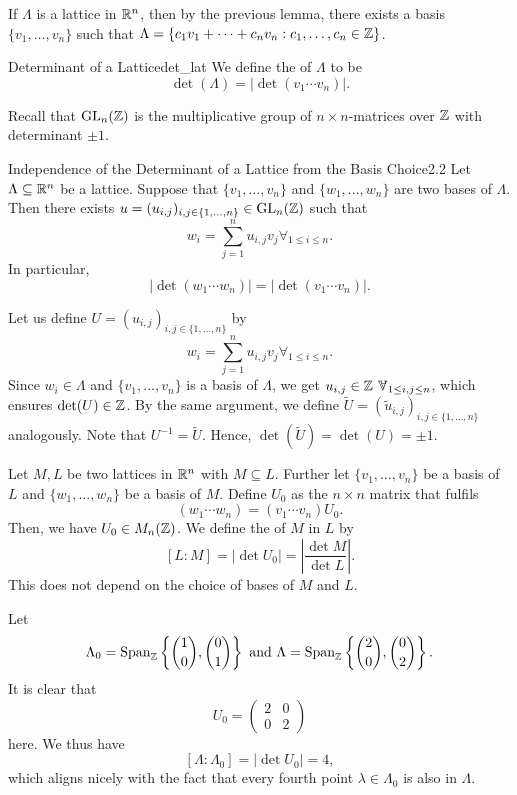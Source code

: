 \documentclass{Vorlesungstemplate_English} %
\begin{document}
  If $\Lambda$ is a lattice in $\mathbb{R}^n$, then by the previous lemma, there exists a basis $\{ v_1, \dots, v_n\}$ such that $\Lambda = \{ c_1v_1 + \dots + c_nv_n: c_1, \dots, c_n \in \mathbb{Z}\}$.
 \begin{definition}{Determinant of a Lattice}{det_lat}
   We define the  of $\Lambda$ to be
   \[ \det(\Lambda) = \left| \det(v_1 \cdots v_n)\right|.\]
 \end{definition}
 \noindent Recall that $\text{GL}_n(\mathbb{Z})$ is the multiplicative group of $n \times n$-matrices over $\mathbb{Z}$ with determinant $\pm 1$.
 \begin{lemma}{Independence of the Determinant of a Lattice from the Basis Choice}{2.2}
   Let $\Lambda \subseteq \mathbb{R}^n$ be a lattice. Suppose that $\{ v_1, \dots, v_n\}$ and $\{ w_1, \dots, w_n\}$ are two bases of $\Lambda$. Then there exists $u = (u_{i,j})_{i,j \in \{ 1, \dots, n\}} \in \text{GL}_n(\mathbb{Z})$ such that
   \[ w_i = \sum_{j=1}^n u_{i,j}v_j \forall_{1 \leq i \leq n}.\]
   In particular,
   \[ |\det(w_1 \cdots w_n)| = |\det(v_1 \cdots v_n)|.\]
 \end{lemma}
 \begin{pf}
   Let us define $U = (u_{i,j})_{i,j \in \{ 1, \dots, n\}}$ by
   \[ w_i = \sum_{j=1}^n u_{i,j}v_j \forall_{1 \leq i \leq n}.\]
   Since $w_i \in \Lambda$ and $\{ v_1, \dots, v_n\}$ is a basis of $\Lambda$, we get $u_{i,j} \in \Z \forall_{1 \leq i,j \leq n}$, which ensures $\det(U)\in \mathbb{Z}$. By the same argument, we define $\widetilde{U} = (\widetilde{u}_{i,j})_{i,j \in \{ 1, \dots, n\}}$ analogously. Note that $U^{-1} = \widetilde{U}$. Hence, $\det(\widetilde{U}) = \det(U) = \pm1$.
 \end{pf}
 \noindent Let $M,L$ be two lattices in $\mathbb{R}^n$ with $M \subseteq L$. Further let $\{ v_1, \dots, v_n\}$ be a basis of $L$ and $\{ w_1, \dots, w_n\}$ be a basis of $M$. Define $U_0$ as the $n\times n$ matrix that fulfils
 \[ (w_1 \cdots w_n) = (v_1 \cdots v_n)U_0.\]
 Then, we have $U_0 \in M_n(\mathbb{Z})$. We define the  of $M$ in $L$ by
 \[ [L:M] = |\det U_0| = \left|\frac{\det M}{\det L}\right|.\]
  This does not depend on the choice of bases of $M$ and $L$. \\
\begin{example} Let
 \[ \Lambda_0 = \text{Span}_{\mathbb{Z}}\left\{ \binom{1}{0}, \binom{0}{1}\right\} \text{ and } \Lambda = \text{Span}_{\mathbb{Z}}\left\{ \binom{2}{0}, \binom{0}{2}\right\}.\]
 {\color{blue} It is clear that
 \[ U_0 = \begin{pmatrix}
   2 & 0 \\
   0 & 2
 \end{pmatrix}\]
 here. We thus have
 \[ [\Lambda: \Lambda_0] = |\det U_0| = 4,\]
 which aligns nicely with the fact that every fourth point $\lambda \in \Lambda_0$ is also in $\Lambda$.}
\end{example}
\end{document}
